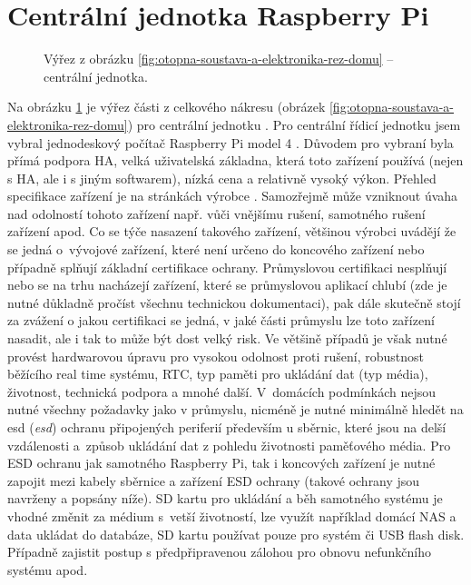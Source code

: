 \section{Centrální jednotka Raspberry Pi}


\begin{figure}[H]
    \centering
    \def\svgwidth{0.3\columnwidth}
    
    \caption[Výřez pro centrální jednotku.]{Výřez z obrázku \ref{fig:otopna-soustava-a-elektronika-rez-domu} – centrální jednotka.}
    \label{fig:vyrez-centralni-jednotka}
\end{figure}

Na obrázku \ref{fig:vyrez-centralni-jednotka} je výřez části z celkového nákresu (obrázek \ref{fig:otopna-soustava-a-elektronika-rez-domu}) pro centrální jednotku . Pro centrální řídicí jednotku jsem vybral jednodeskový počítač Raspberry Pi model 4 \cite{raspberry-pi}. Důvodem pro vybraní byla přímá podpora HA, velká uživatelská základna, která toto zařízení používá (nejen s HA, ale i s jiným softwarem), nízká cena a relativně vysoký výkon. Přehled specifikace zařízení je na stránkách výrobce \cite{raspberry-pi}. Samozřejmě může vzniknout úvaha nad odolností tohoto zařízení např. vůči vnějšímu rušení, samotného rušení zařízení apod. Co se týče nasazení takového zařízení, většinou výrobci uvádějí že se jedná o~vývojové zařízení, které není určeno do koncového zařízení nebo případně splňují  základní certifikace ochrany. Průmyslovou certifikaci nesplňují nebo se na trhu nacházejí zařízení, které se průmyslovou aplikací chlubí (zde je nutné důkladně pročíst všechnu technickou dokumentaci), pak dále skutečně stojí za zvážení o jakou certifikaci se jedná, v jaké části průmyslu lze toto zařízení nasadit, ale i tak to může být dost velký risk. Ve většině případů je však nutné provést hardwarovou úpravu pro vysokou odolnost proti rušení, robustnost běžícího real time systému, RTC, typ paměti pro ukládání dat (typ média), životnost, technická podpora a mnohé další. V~domácích podmínkách nejsou nutné všechny požadavky jako v průmyslu, nicméně je nutné minimálně hledět na \acrshort{esd} (\textit{\acrlong{esd}}) ochranu připojených periferií především u sběrnic, které jsou na delší vzdálenosti a~způsob ukládání dat z pohledu životnosti paměťového média. Pro ESD ochranu jak samotného Raspberry Pi, tak i koncových zařízení je nutné zapojit mezi kabely sběrnice a zařízení ESD ochrany (takové ochrany jsou navrženy a popsány níže). SD kartu pro ukládání a běh samotného systému je vhodné změnit za médium s~vetší životností, lze využít například domácí NAS a data ukládat do databáze, SD kartu používat pouze pro systém či USB flash disk. Případně zajistit postup s předpřipravenou zálohou pro obnovu nefunkčního systému apod. 